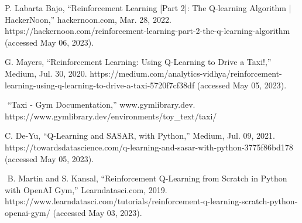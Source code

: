 \documentclass[conference]{IEEEtran}
\begin{document}
\begin{thebibliography}{00}

 P. Labarta Bajo, “Reinforcement Learning [Part 2]: The Q-learning Algorithm | HackerNoon,” hackernoon.com, Mar. 28, 2022. https://hackernoon.com/reinforcement-learning-part-2-the-q-learning-algorithm (accessed May 06, 2023).

 G. Mayers, “Reinforcement Learning: Using Q-Learning to Drive a Taxi!,” Medium, Jul. 30, 2020. https://medium.com/analytics-vidhya/reinforcement-learning-using-q-learning-to-drive-a-taxi-5720f7cf38df (accessed May 05, 2023).

‌ “Taxi - Gym Documentation,” www.gymlibrary.dev. https://www.gymlibrary.dev/environments/toy\_text/taxi/

 C. De-Yu, “Q-Learning and SASAR, with Python,” Medium, Jul. 09, 2021. https://towardsdatascience.com/q-learning-and-sasar-with-python-3775f86bd178 (accessed May 05, 2023).

‌ B. Martin and S. Kansal, “Reinforcement Q-Learning from Scratch in Python with OpenAI Gym,” Learndatasci.com, 2019. https://www.learndatasci.com/tutorials/reinforcement-q-learning-scratch-python-openai-gym/ (accessed May 03, 2023).

‌
\end{thebibliography}
\end{document}
